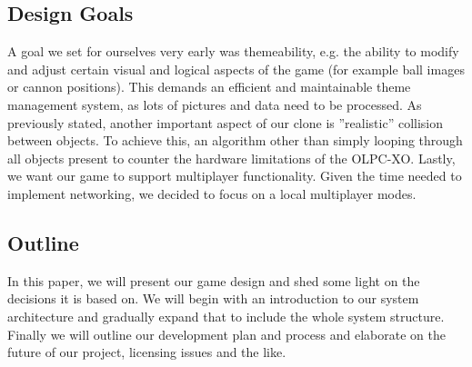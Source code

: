 \subsection{Design Goals}
A goal we set for ourselves very early was themeability, e.g. the ability to modify and adjust certain visual and logical aspects of the game (for example ball images or cannon positions). This demands an efficient and maintainable theme management system, as lots of pictures and data need to be processed.
As previously stated, another important aspect of our clone is ''realistic'' collision between objects. To achieve this, an algorithm other than simply looping through all objects present to counter the hardware limitations of the OLPC-XO.
Lastly, we want our game to support multiplayer functionality. Given the time needed to implement networking, we decided to focus on a local multiplayer modes.
%
\subsection{Outline}
In this paper, we will present our game design and shed some light on the decisions 
it is based on. We will begin with an introduction to our system architecture and 
gradually expand that to include the whole system structure.\\
Finally we will outline our development plan and process and elaborate on the 
future of our project, licensing issues and the like.
%
